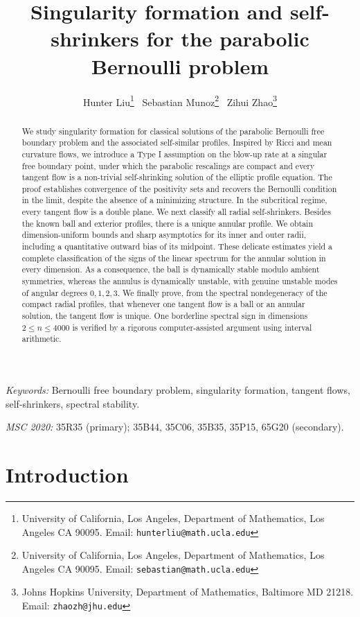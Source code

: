 \documentclass[11pt]{article}
\title{Singularity formation and self-shrinkers for the parabolic Bernoulli problem}
\author{Hunter Liu\thanks{{University of California, Los Angeles, Department of Mathematics, Los Angeles CA 90095. Email: \texttt{hunterliu@math.ucla.edu}}} \,
Sebastian Munoz\thanks{{University of California, Los Angeles, Department of Mathematics, Los Angeles CA 90095. Email: \texttt{sebastian@math.ucla.edu}}} \, 
Zihui Zhao\thanks{{Johns Hopkins University, Department of Mathematics, Baltimore MD 21218. Email: \texttt{zhaozh@jhu.edu}}}
}
\date{}
\numberwithin{equation}{section}
\theoremstyle{definition}
\begin{document}
\maketitle

\begin{abstract} 
We study singularity formation for classical solutions of the parabolic Bernoulli free boundary problem and the associated self-similar profiles. Inspired by Ricci and mean curvature flows, we introduce a Type I assumption on the blow-up rate at a singular free boundary point, under which the parabolic rescalings are compact and every tangent flow is a non-trivial self-shrinking solution of the elliptic profile equation. The proof establishes convergence of the positivity sets and recovers the Bernoulli condition in the limit, despite the absence of a minimizing structure. In the subcritical regime, every tangent flow is a double plane. We next classify all radial self-shrinkers. Besides the known ball and exterior profiles, there is a unique annular profile. We obtain dimension-uniform bounds and sharp asymptotics for its inner and outer radii, including a quantitative outward bias of its midpoint. These delicate estimates yield a complete classification of the signs  of the linear spectrum for the annular solution in every dimension. As a consequence, the ball is dynamically stable modulo ambient symmetries, whereas the annulus is dynamically unstable, with genuine unstable modes of angular degrees $0,1,2,3$.  We finally prove, from the spectral nondegeneracy of the compact radial profiles, that whenever one tangent flow is a ball or an annular solution, the tangent flow is unique. One borderline spectral sign in dimensions $2\leq n \leq 4000$ is verified by a rigorous computer-assisted argument using interval arithmetic.

\end{abstract}

\medskip
\noindent\emph{Keywords:} Bernoulli free boundary problem, singularity formation, tangent flows, self-shrinkers, spectral stability.

\smallskip
\noindent\emph{MSC 2020:} 35R35 (primary); 35B44, 35C06, 35B35, 35P15, 65G20 (secondary).

\setcounter{tocdepth}{1} %
\tableofcontents
 

\section{Introduction}
\end{document}
